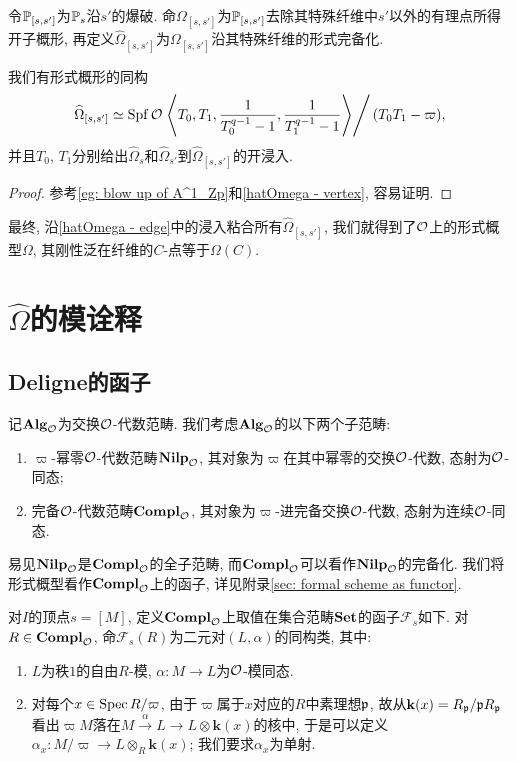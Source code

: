 令$\P_{[s, s']}$为$\P_s$沿$s'$的爆破.
命$\Omega_{[s, s']}$为$\P_{[s, s']}$去除其特殊纤维中$s'$以外的有理点所得开子概形, 再定义$\hat{\Omega}_{[s, s']}$为$\Omega_{[s, s']}$沿其特殊纤维的形式完备化.




\begin{proposition}\label{hatOmega - edge}
    我们有形式概形的同构\[\hat{\Omega}_{[s, s']} \simeq \spf\O\left.\left< T_0, T_1, \frac{1}{T_0^{q-1}-1}, \frac{1}{T_1^{q-1}-1} \right>\right/ (T_0T_1 - \varpi),\]
    并且$T_0$, $T_1$分别给出$\hat{\Omega}_s$和$\hat{\Omega}_{s'}$到$\hat{\Omega}_{[s, s']}$的开浸入.
\end{proposition}
\begin{proof}
    参考\cref{eg: blow up of A^1_Zp}\;和\cref{hatOmega - vertex}, 容易证明.
\end{proof}

最终, 沿\cref{hatOmega - edge}\;中的浸入粘合所有$\hat{\Omega}_{[s, s']}$, 我们就得到了$\O$上的形式概型$\Omega$, 其刚性泛在纤维的$C$-点等于$\Omega(C)$.

\section{$\hat{\Omega}$的模诠释}

\subsection{Deligne的函子}
记$\alg_\O$为交换$\O$-代数范畴. 我们考虑$\alg_\O$的以下两个子范畴:
\begin{enumerate}
    \item [\myit] $\varpi$-幂零$\O$-代数范畴$\nilp$, 其对象为$\varpi$在其中幂零的交换$\O$-代数, 态射为$\O$-同态;
    \item [\myit] 完备$\O$-代数范畴$\compl$, 其对象为$\varpi$-进完备交换$\O$-代数, 态射为连续$\O$-同态.
\end{enumerate}
易见$\nilp$是$\compl$的全子范畴, 而$\compl$可以看作$\nilp$的完备化.
我们将形式概型看作$\compl$上的函子, 详见附录\;\ref{sec: formal scheme as functor}.

对$I$的顶点$s = [M]$, 定义$\compl$上取值在集合范畴$\set$的函子$\mathcal{F}_s$如下. 对$R\in\compl$, 命$\mathcal{F}_s(R)$为二元对$(L, \alpha)$的同构类, 其中:
\begin{enumerate}
    \item [\myit] $L$为秩$1$的自由$R$-模, $\alpha : M\to L$为$\O$-模同态.
    \item [\myit] 对每个$x\in\spec R/\varpi$, 
    由于$\varpi$属于$x$对应的$R$中素理想$\frp$, 故从$\mathbf{k}(x) = R_\frp/\frp R_\frp$看出$\varpi M$落在$M\stackrel{\alpha}{\to} L\to L\otimes \mathbf{k}(x)$的核中,
    于是可以定义$\alpha_x : M/\varpi\to L\otimes_R \mathbf{k}(x)$; 我们要求$\alpha_x$为单射.
\end{enumerate}

